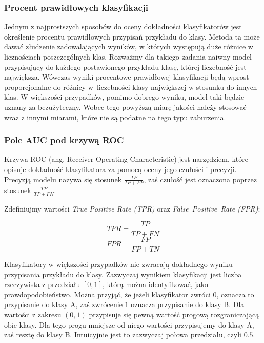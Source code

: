 \documentclass[a4paper, twoside, 11pt, openright]{article}
\begin{document}
\subsubsection{Procent prawidłowych klasyfikacji}

Jednym z najprostszych sposobów do oceny dokładności klasyfikatorów jest określenie procentu prawidłowych przypisań przykładu do klasy. Metoda ta może dawać złudzenie zadowalających wyników, w których występują duże różnice w licznościach poszczególnych klas. Rozważmy dla takiego zadania naiwny model przypisujący do każdego postawionego przykładu klasę, której liczebność jest największa. Wówczas wyniki procentowe prawidłowej klasyfikacji będą wprost proporcjonalne do różnicy w~liczebności klasy największej w stosunku do innych klas. W większości przypadków, pomimo dobrego wyniku, model taki będzie uznany za bezużyteczny. Wobec tego powyższą miarę jakości należy stosować wraz z innymi miarami, które nie są podatne na tego typu zaburzenia.

\subsubsection{Pole AUC pod krzywą ROC}

Krzywa ROC (ang. Receiver Operating Characteristic)\cite{roc} jest narzędziem, które opisuje dokładność klasyfikatora za pomocą oceny jego czułości i precyzji. Precyzją modelu nazywa się stosunek $\frac{TP}{TP+FP}$, zaś czułość jest oznaczona poprzez stosunek $\frac{TP}{TP+FN}$.

\bigskip

Zdefiniujmy wartości \textit{True Positive Rate (TPR)} oraz \textit{False\ Positive\ Rate (FPR)}:


\begin{equation}
TPR = \frac{TP}{TP+FN}
\end{equation}
\begin{equation}
FPR = \frac{FP}{FP+TN}
\end{equation}

Klasyfikatory w większości przypadków nie zwracają dokładnego wyniku przypisania przykładu do klasy. Zazwyczaj wynikiem klasyfikacji jest liczba rzeczywista z przedziału $[0, 1]$, którą można identyfikować, jako prawdopodobieństwo. Można przyjąć, że jeżeli klasyfikator zwróci $0$, oznacza to przypisanie do klasy A, zaś zwrócenie $1$ oznacza przypisanie do klasy B. Dla wartości z zakresu $(0, 1)$ przypisuje się pewną wartość progową rozgraniczającą obie klasy. Dla tego progu mniejsze od niego wartości przypisujemy do klasy A, zaś resztę do klasy B. Intuicyjnie jest to zazwyczaj połowa przedziału, czyli $0.5$.
\end{document}
